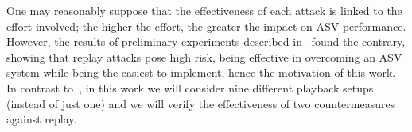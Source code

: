 One may reasonably suppose that the effectiveness of each attack is linked to the effort involved; the higher the effort, the greater the impact on ASV performance. 
However, the results of preliminary experiments described in~\cite{Alegre2014} found the contrary, showing that replay attacks pose high risk, being effective in overcoming an ASV system while being the easiest to implement, hence the motivation of this work. In contrast to~\cite{Alegre2014}, in this work we will consider nine different playback setups (instead of just one) and we will verify the effectiveness of two countermeasures against replay.
